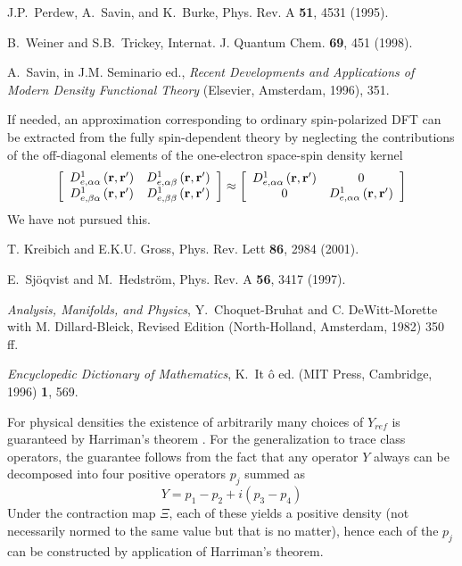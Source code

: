 \begin{references}
 J.P.~Perdew, A.~Savin, and K.~Burke, Phys. Rev. A {\bf %
51}, 4531 (1995).

 B.~Weiner and S.B.~Trickey, Internat. J. Quantum Chem. 
{\bf 69}, 451 (1998).

 A.~Savin, in J.M. Seminario ed., {\it Recent
Developments and Applications of Modern Density Functional Theory}
(Elsevier, Amsterdam, 1996), 351.

 If needed, an approximation corresponding to ordinary
spin-polarized DFT can be extracted from the fully spin-dependent theory by
neglecting the contributions of the off-diagonal elements of the
one-electron space-spin density kernel 
\begin{equation}
\left[ 
\begin{array}{cc}
D_{e,\alpha \alpha }^{1}\left( {\bf r,r}^{\prime }\right) & D_{e,\alpha
\beta }^{1}\left( {\bf r,r}^{\prime }\right) \\ 
D_{e,\beta \alpha }^{1}\left( {\bf r,r}^{\prime }\right) & D_{e,\beta \beta
}^{1}\left( {\bf r,r}^{\prime }\right)%
\end{array}%
\right] \approx \left[ 
\begin{array}{cc}
D_{e,\alpha \alpha }^{1}\left( {\bf r,r}^{\prime }\right) & 0 \\ 
0 & D_{e,\alpha \alpha }^{1}\left( {\bf r,r}^{\prime }\right)%
\end{array}%
\right]  \nonumber
\end{equation}
We have not pursued this.

 T. Kreibich and E.K.U. Gross, Phys. Rev. Lett {\bf 86},
2984 (2001).

 E.~Sj\"oqvist and M.~Hedstr\"om, Phys. Rev. A {\bf 56},
3417 (1997).

 {\it Analysis, Manifolds, and Physics}, Y.~Choquet-Bruhat
and C. DeWitt-Morette with M. Dillard-Bleick, Revised Edition
(North-Holland, Amsterdam, 1982) 350 ff.

 {\it Encyclopedic Dictionary of Mathematics}, K.~It%
\^o ed. (MIT Press, Cambridge, 1996) {\bf 1}, 569.

 For physical densities the existence of arbitrarily many
choices of $Y_{ref}$ is guaranteed by Harriman's theorem \cite{Harriman81}.
For the generalization to trace class operators, the guarantee follows from
the fact that any operator $Y$ always can be decomposed into four positive
operators $p_{j}$ summed as 
\[
Y=p_{1}-p_{2}+i(p_{3}-p_{4}) 
\]%
Under the contraction map $\Xi $, each of these yields a positive density
(not necessarily normed to the same value but that is no matter), hence each
of the $p_{j}$ can be constructed by application of Harriman's theorem.


\end{references}
